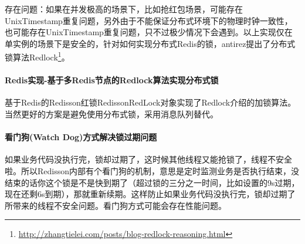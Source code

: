 \documentclass[../../../interview-questions.tex]{subfiles}
\begin{document}
存在问题：如果在并发极高的场景下，比如抢红包场景，可能存在UnixTimestamp重复问题，另外由于不能保证分布式环境下的物理时钟一致性，也可能存在UnixTimestamp重复问题，只不过极少情况下会遇到。以上实现仅在单实例的场景下是安全的，针对如何实现分布式Redis的锁，antirez提出了分布式锁算法Redlock\footnote{\url{http://zhangtielei.com/posts/blog-redlock-reasoning.html}}。

\paragraph{Redis实现-基于多Redis节点的Redlock算法实现分布式锁}

基于Redis的Redisson红锁RedissonRedLock对象实现了Redlock介绍的加锁算法。当然更好的方案是避免使用分布式锁，采用消息队列替代。

\paragraph{看门狗(Watch Dog)方式解决锁过期问题}

如果业务代码没执行完，锁却过期了，这时候其他线程又能抢锁了，线程不安全啦。所以Redisson内部有个看门狗的机制，意思是定时监测业务是否执行结束，没结束的话你这个锁是不是快到期了（超过锁的三分之一时间，比如设置的9s过期，现在还剩6s到期），那就重新续期。这样防止如果业务代码没执行完，锁却过期了所带来的线程不安全问题。看门狗方式可能会存在性能问题。
\end{document}
